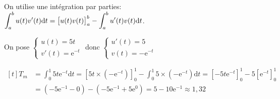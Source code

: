 \documentclass[10pt]{article}
\providecommand{\e}{{\mathrm{e}}}
\renewcommand{\d}{{\mathrm{d}}}
\providecommand{\ds}{\displaystyle}
\begin{document}
On utilise une intégration par parties:
$\ds\int_{a}^{b} u(t)v'(t)\d t =\left [ u(t)v(t)\strut \right ]_{a}^{b} -\int_{a}^{b} u'(t) v(t) \d t$.

On pose
$\left \{
\begin{array}{l}
u(t)=5t\\
v'(t)=\e^{-t}
\end{array}
\right .$
donc
$\left \{
\begin{array}{l}
u'(t)=5\\
v(t)= - \e^{-t}
\end{array}
\right .$

$\begin{aligned}[t]
T_m
& = \displaystyle\int_0^1 5t\e^{-t} \d t
 = \left [5t\times \left (-\e^{-t} \right )\right ]_{0}^{1}- \ds\int_{0}^{1} 5\times \left ( -\e^{-t} \right ) \d t
  = \left [-5 t\e^{-t} \right ]_{0}^{1}- 5\left [ \e^{-t} \right ]_{0}^{1}\\
& = \left (-5\e^{-1}-0\right )-\left (-5\e^{-1} + 5\e^{0} \right )
= 5-10\e^{-1} \approx 1,32
\end{aligned}$



\bigskip
\end{document}
